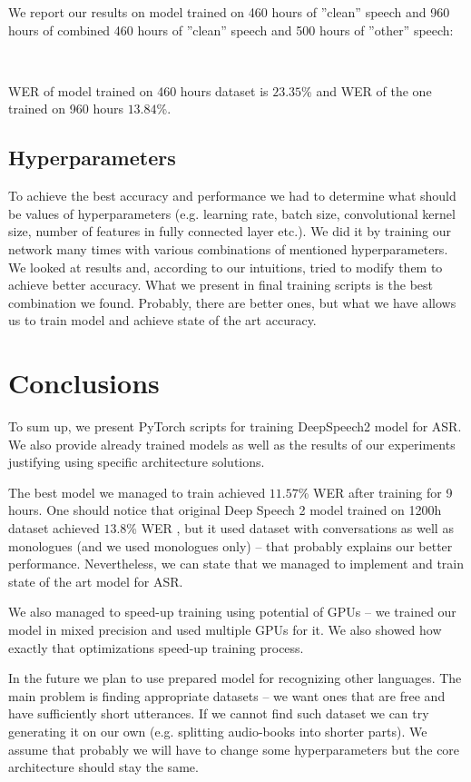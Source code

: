 \documentclass[licencjacka,en]{pracamgr}
\newcommand{\todoplot}[1]{
	\ \\
	\noindent%
	\begin{minipage}{\linewidth}%
		\makebox[\linewidth]{%
			\begin{tikzpicture}
			\begin{axis}[
			ymin = 0, ymax = 5,
			xmin = 0, xmax = 600,
			minor y tick num = 4,
			minor x tick num = 1,
			ymajorgrids = true,
			grid style = dashed,
			scaled x ticks = false,
			xlabel = TODO,
			ylabel = TODO,
			legend pos=outer north east,
			no markers
			]
			\addplot table[x=epochs,y=training]{\first};
			\addlegendentry{TODO}
			
			\end{axis}
			\end{tikzpicture}
		}\captionof{figure}{#1}\label{diag:time}     
	\end{minipage}
}
\begin{document}
	We report our results on model trained on 460 hours of ''clean'' speech and 960 hours of combined 460 hours of ''clean'' speech and 500 hours of ''other'' speech:
	
	\todoplot{TODO}
	
	WER of model trained on 460 hours dataset is $23.35$\% and WER of the one trained on 960 hours $13.84$\%.
	
	\section{Hyperparameters}
	To achieve the best accuracy and performance we had to determine what should be values of hyperparameters (e.g. learning rate, batch size, convolutional kernel size, number of features in fully connected layer etc.). We did it by training our network many times with various combinations of mentioned hyperparameters. We looked at results and, according to our intuitions, tried to modify them to achieve better accuracy. What we present in final training scripts is the best combination we found. Probably, there are better ones, but what we have allows us to train model and achieve state of the art accuracy.
	
	
	\chapter{Conclusions}\label{r:concls}
	
	To sum up, we present PyTorch scripts for training DeepSpeech2 model for ASR. We also provide already trained models as well as the results of our experiments justifying using specific architecture solutions.
	
	The best model we managed to train achieved $11.57$\% WER after training for 9 hours. One should notice that original Deep Speech 2 model trained on 1200h dataset achieved $13.8$\% WER \cite{DS2}, but it used dataset with conversations as well as monologues (and we used monologues only) -- that probably explains our better performance. Nevertheless, we can state that we managed to implement and train state of the art model for ASR.
	
	We also managed to speed-up training using potential of GPUs -- we trained our model in mixed precision and used multiple GPUs for it. We also showed how exactly that optimizations speed-up training process.
	
	In the future we plan to use prepared model for recognizing other languages. The main problem is finding appropriate datasets -- we want ones that are free and have sufficiently short utterances. If we cannot find such dataset we can try generating it on our own (e.g. splitting audio-books into shorter parts). We assume that probably we will have to change some hyperparameters but the core architecture should stay the same.
	
\end{document}
